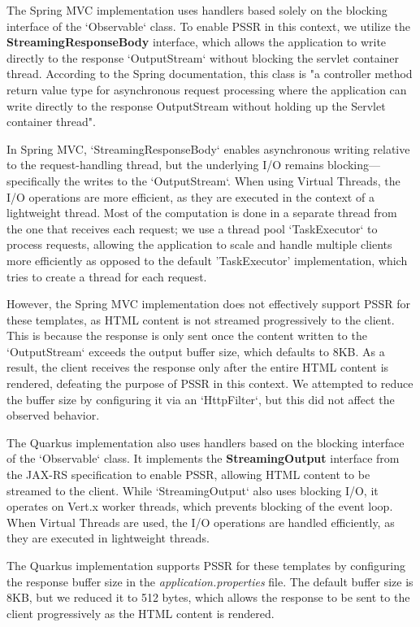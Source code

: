 \documentclass[../ppG48.tex]{subfiles}
\begin{document}
The Spring MVC implementation uses handlers based solely on the blocking interface of the `Observable` class. To enable PSSR in this context, we utilize the \textbf{StreamingResponseBody} interface, which allows the application to write directly to the response `OutputStream` without blocking the servlet container thread. According to the Spring documentation, this class is "a controller method return value type for asynchronous request processing where the application can write directly to the response OutputStream without holding up the Servlet container thread". 

In Spring MVC, `StreamingResponseBody` enables asynchronous writing relative to the request-handling thread, but the underlying I/O remains blocking—specifically the writes to the `OutputStream`. When using Virtual Threads, the I/O operations are more efficient, as they are executed in the context of a lightweight thread. Most of the computation is done in a separate thread from the one that receives each request; we use a thread pool `TaskExecutor` to process requests, allowing the application to scale and handle multiple clients more efficiently as opposed to the default 'TaskExecutor' implementation, which tries to create a thread for each request. 

However, the Spring MVC implementation does not effectively support PSSR for these templates, as HTML content is not streamed progressively to the client. This is because the response is only sent once the content written to the `OutputStream` exceeds the output buffer size, which defaults to 8KB. As a result, the client receives the response only after the entire HTML content is rendered, defeating the purpose of PSSR in this context. We attempted to reduce the buffer size by configuring it via an `HttpFilter`, but this did not affect the observed behavior.

The Quarkus implementation also uses handlers based on the blocking interface of the `Observable` class. It implements the \textbf{StreamingOutput} interface from the JAX-RS specification to enable PSSR, allowing HTML content to be streamed to the client. While `StreamingOutput` also uses blocking I/O, it operates on Vert.x worker threads, which prevents blocking of the event loop. When Virtual Threads are used, the I/O operations are handled efficiently, as they are executed in lightweight threads.

The Quarkus implementation supports PSSR for these templates by configuring the response buffer size in the \textit{application.properties} file. The default buffer size is 8KB, but we reduced it to 512 bytes, which allows the response to be sent to the client progressively as the HTML content is rendered.
\end{document}
